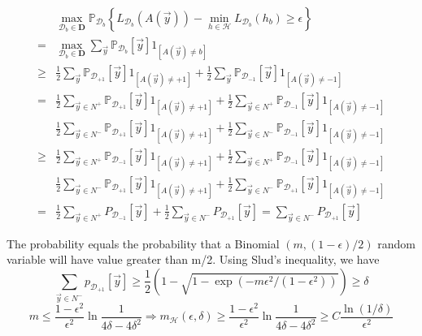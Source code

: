 \begin{align*}
    &\max_{\mathcal{D}_b \in \mathbf{D}} \mathbb{P}_{\mathcal{D}_b} \left\{ L_{\mathcal{D}_b}(A(\vec{y})) - \min_{h \in \mathcal{H}} L_{\mathcal{D}_b}(h_b) \ge \epsilon \right\}\\
    =& \max_{\mathcal{D}_b \in \mathbf{D}} \sum^{}_{\vec{y}} \mathbb{P}_{\mathcal{D}_b}[\vec{y}] 1_{[A(\vec{y})\ne b]}\\
    \ge& \frac{1}{2} \sum^{}_{\vec{y}} \mathbb{P}_{\mathcal{D}_{+1}}[\vec{y}]1_{[A(\vec{y})\ne +1]}
    + \frac{1}{2} \sum^{}_{\vec{y}} \mathbb{P}_{\mathcal{D}_{-1}}[\vec{y}]1_{[A(\vec{y})\ne -1]}\\
    =& \frac{1}{2} \sum^{}_{\vec{y} \in N^+} \mathbb{P}_{\mathcal{D}_{+1}}[\vec{y}]1_{[A(\vec{y})\ne +1]}
    + \frac{1}{2} \sum^{}_{\vec{y} \in N^+} \mathbb{P}_{\mathcal{D}_{-1}}[\vec{y}]1_{[A(\vec{y})\ne -1]}\\
    &\frac{1}{2} \sum^{}_{\vec{y} \in N^-} \mathbb{P}_{\mathcal{D}_{+1}}[\vec{y}]1_{[A(\vec{y})\ne +1]}
    + \frac{1}{2} \sum^{}_{\vec{y} \in N^-} \mathbb{P}_{\mathcal{D}_{-1}}[\vec{y}]1_{[A(\vec{y})\ne -1]}\\
    \ge& \frac{1}{2} \sum^{}_{\vec{y} \in N^+} \mathbb{P}_{\mathcal{D}_{-1}}[\vec{y}]1_{[A(\vec{y})\ne +1]}
    + \frac{1}{2} \sum^{}_{\vec{y} \in N^+} \mathbb{P}_{\mathcal{D}_{-1}}[\vec{y}]1_{[A(\vec{y})\ne -1]}\\
    &\frac{1}{2} \sum^{}_{\vec{y} \in N^-} \mathbb{P}_{\mathcal{D}_{+1}}[\vec{y}]1_{[A(\vec{y})\ne +1]}
    + \frac{1}{2} \sum^{}_{\vec{y} \in N^-} \mathbb{P}_{\mathcal{D}_{+1}}[\vec{y}]1_{[A(\vec{y})\ne -1]}\\
    =& \frac{1}{2} \sum^{}_{\vec{y} \in N^+} P_{\mathcal{D}_{-1}}[\vec{y}]
    +\frac{1}{2} \sum^{}_{\vec{y} \in N^-} P_{\mathcal{D}_{+1}}[\vec{y}] = \sum^{}_{\vec{y} \in N^-} P_{\mathcal{D}_{+1}}[\vec{y}]
\end{align*}

The probability equals the probability that a Binomial $ (m, (1-\epsilon)/2) $ random variable will have value greater than m/2. Using Slud's inequality, we have
\[
    \sum^{}_{\vec{y} \in N^-} p_{\mathcal{D}_{+1}}[\vec{y}] \ge
    \frac{1}{2} \left( 1 - \sqrt{1 - \exp \left( -m \epsilon^2 / (1-\epsilon^2) \right)} \right) \ge \delta
\]
\[
    m \le \frac{1 - \epsilon^2}{\epsilon^2} \ln \frac{1}{4\delta - 4\delta^2}
    \Rightarrow m_\mathcal{H}(\epsilon, \delta) \ge \frac{1 - \epsilon^2}{\epsilon^2} \ln \frac{1}{4\delta - 4\delta^2}
    \ge C \frac{\ln(1/\delta)}{\epsilon^2} 
\]

